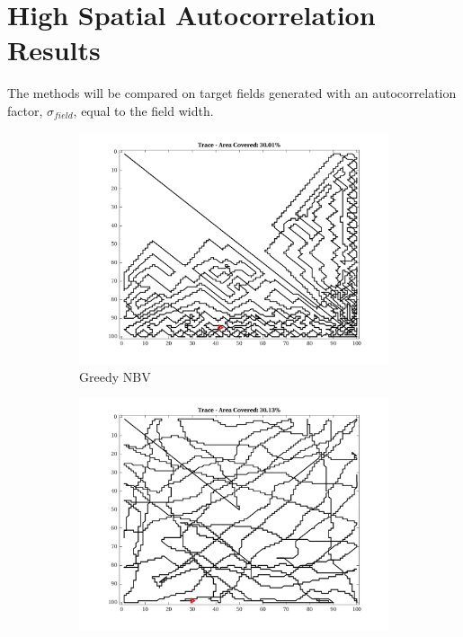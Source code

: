 \section{High Spatial Autocorrelation Results}
The methods will be compared on target fields generated with an autocorrelation factor, $\sigma_{field}$, equal to the field width.

\begin{figure}[htb!]
    \centering
    \begin{subfigure}[t]{0.25\textwidth}
        \centering
        \includegraphics[width=\linewidth]{figures/path_greedy_30p_100x100_sf_100_seed_1.png}
        \captionsetup{skip=0.20\baselineskip,size=footnotesize}
        \caption{Greedy NBV}
    \end{subfigure}%
    \begin{subfigure}[t]{0.25\textwidth}
        \centering
        \includegraphics[width=\linewidth]{figures/path_mc_30p_100x100_sf_100_seed_1.png}

\end{subfigure}
\end{figure}

